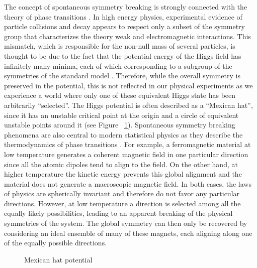 \documentclass{article}
\begin{document}
The concept of spontaneous symmetry breaking is strongly connected with the theory of phase transitions \citep{stanley1971phase, donoghue2014dynamics}. In high energy physics, experimental evidence of particle collisions and decay appears to respect only a subset of the symmetry group that characterizes the theory weak and electromagnetic interactions. This mismatch, which is responsible for the non-null mass of several particles, is thought to be due to the fact that the potential energy of the Higgs field has infinitely many minima, each of which corresponding to a subgroup of the symmetries of the standard model \citep{PhysRevLett.13.321, PhysRevLett.13.508, anderson1963plasmons, nambu1961dynamical}. Therefore, while the overall symmetry is preserved in the potential, this is not reflected in our physical experiments as we experience a world where only one of these equivalent Higgs state has been arbitrarily ``selected''. The Higgs potential is often described as a ``Mexican hat'', since it has an unstable critical point at the origin and a circle of equivalent unstable points around it (see Figure ~\ref{fig:mexican_hat}). Spontaneous symmetry breaking phenomena are also central to modern statistical physics as they describe the thermodynamics of phase transitions \citep{stanley1971phase}. For example, a ferromagnetic material at low temperature generates a coherent magnetic field in one particular direction since all the atomic dipoles tend to align to the field. On the other hand, at higher temperature the kinetic energy prevents this global alignment and the material does not generate a macroscopic magnetic field. In both cases, the laws of physics are spherically invariant and therefore do not favor any particular directions. However, at low temperature a direction is selected among all the equally likely possibilities, leading to an apparent breaking of the physical symmetries of the system. The global symmetry can then only be recovered by considering an ideal ensemble of many of these magnets, each aligning along one of the equally possible directions. 

\begin{figure}
\vspace{-3mm}
\centering
    
    \captionsetup{justification=centering}
   \caption{Mexican hat potential}
   \label{fig:mexican_hat}
   \vspace{-1.2 mm}
\end{figure}
\end{document}

